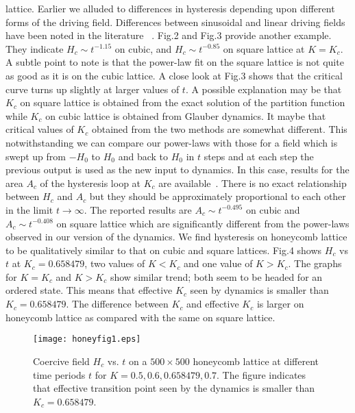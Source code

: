 \documentclass[a4,aps,amsmath,floatfix,nofootinbib,10pt]{revtex4}
\begin{document}
lattice. Earlier we alluded to differences in hysteresis depending upon 
different forms of the driving field. Differences between sinusoidal 
and linear driving fields have been noted in the literature ~\cite{rao, 
samoza, thomas, zheng}. Fig.2 and Fig.3 provide another example. They 
indicate $H_c \sim t^{-1.15}$ on cubic, and $H_c \sim t^{-0.85}$ on 
square lattice at $K=K_c$. A subtle point to note is that the power-law 
fit on the square lattice is not quite as good as it is on the cubic 
lattice. A close look at Fig.3 shows that the critical curve turns up 
slightly at larger values of $t$. A possible explanation may be that 
$K_c$ on square lattice is obtained from the exact solution of the 
partition function while $K_c$ on cubic lattice is obtained from 
Glauber dynamics. It maybe that critical values of $K_c$ obtained from 
the two methods are somewhat different. This notwithstanding we can 
compare our power-laws with those for a field which is swept up from 
$-H_0$ to $H_0$ and back to $H_0$ in $t$ steps and at each step the 
previous output is used as the new input to dynamics. In this case, 
results for the area $A_c$ of the hysteresis loop at $K_c$ are 
available~\cite{zheng}. There is no exact relationship between $H_c$ 
and $A_c$ but they should be approximately proportional to each other 
in the limit $t \to \infty$. The reported results are $A_c \sim 
t^{-0.495}$ on cubic and $A_c \sim t^{-0.408}$ on square lattice which 
are significantly different from the power-laws observed in our version 
of the dynamics. We find hysteresis on honeycomb lattice to be 
qualitatively similar to that on cubic and square lattices. Fig.4 shows 
$H_c$ vs $t$ at $K_c=0.658479$, two values of $K<K_c$ and one value of 
$K>K_c$. The graphs for $K=K_c$ and $K>K_c$ show similar trend; both 
seem to be headed for an ordered state. This means that effective $K_c$ 
seen by dynamics is smaller than $K_c=0.658479$. The difference between 
$K_c$ and effective $K_c$ is larger on honeycomb lattice as compared 
with the same on square lattice.


\begin{figure}[ht] 
\texttt{[image: honeyfig1.eps]} \caption{ 
Coercive field $H_c$ vs. $t$ on a $500\times500$ honeycomb lattice at 
different time periods $t$ for $K=0.5, 0.6, 0.658479, 0.7$. The figure 
indicates that effective transition point seen by the dynamics is 
smaller than $K_c=0.658479$.} \label{fig4} \end{figure}
\end{document}
